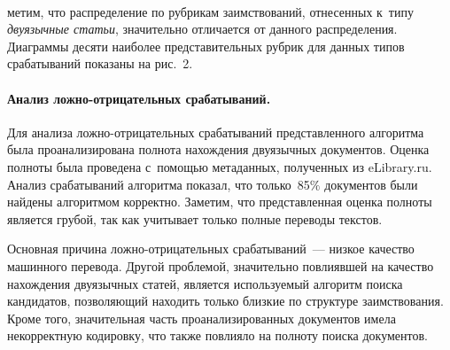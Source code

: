 \setcounter{figure}{1}
\begin{figure*} 
 \vspace*{1pt}
\begin{center}  %
   \mbox{%
\epsfxsize=142.211mm
}

\end{center}
\vspace*{-9pt}
\vspace*{-3pt}

\end{figure*}

\begin{multicols}{2}

\noindent
метим, что распределение по рубрикам заимствований, отнесенных к~типу 
\textit{двуязычные статьи},
 значительно отличается от данного распределения.
Диаграммы десяти наиболее представительных руб\-рик для данных типов срабатываний 
показаны на рис.~2.




\paragraph*{Анализ ложно-от\-ри\-ца\-тель\-ных срабатываний.}
Для анализа лож\-но-от\-ри\-ца\-тель\-ных срабатываний представленного алгоритма была 
проанализирована полнота нахождения двуязычных документов. Оценка полноты была 
проведена с~помощью метаданных, полученных из {\sf eLibrary.ru}. Анализ срабатываний 
алгоритма показал, что только~85$\%$ документов были найдены алгоритмом 
корректно.  Заметим, что представленная оценка полноты является грубой, так как 
учитывает только полные переводы текстов.





Основная причина лож\-но-от\-ри\-ца\-тель\-ных срабатываний~--- низкое качество машинного 
перевода. Другой проб\-ле\-мой, значительно повлиявшей на качество нахождения 
двуязычных статей, является используемый алгоритм поиска кандидатов, позволяющий 
находить только близкие по структуре заимствования. Кроме того, значительная 
часть проанализированных документов имела некорректную кодировку, что также 
повлияло на полноту поиска документов.

\vspace*{-12pt}


\end{multicols}
